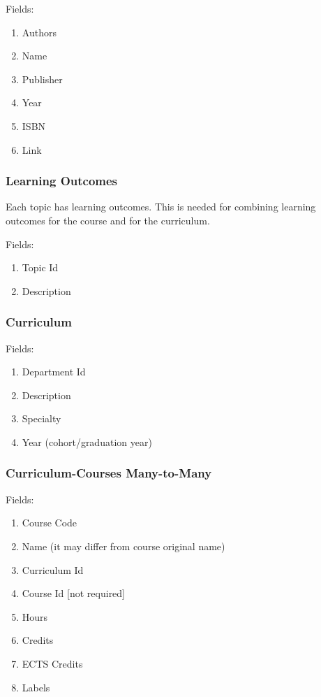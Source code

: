 Fields:
\begin{enumerate}
\item Authors
\item Name
\item Publisher
\item Year
\item ISBN
\item Link
\end{enumerate}


\subsubsection{Learning Outcomes}

Each topic has learning outcomes. This is needed for combining learning outcomes for the course and for the curriculum. 

Fields:
\begin{enumerate}
\item Topic Id
\item Description
\end{enumerate}

\subsubsection{Curriculum}

Fields:
\begin{enumerate}
\item Department Id
\item Description
\item Specialty
\item Year (cohort/graduation year)
\end{enumerate}

\subsubsection{Curriculum-Courses Many-to-Many}

Fields:
\begin{enumerate}
\item Course Code 
\item Name (it may differ from course original name)
\item Curriculum Id
\item Course Id [not required]
\item Hours
\item Credits
\item ECTS Credits
\item Labels
\end{enumerate}

